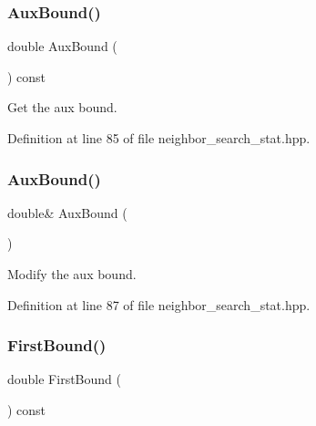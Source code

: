 \subsubsection{Aux\+Bound()\hspace{0.1cm}{\footnotesize\ttfamily [1/2]}}
{\footnotesize\ttfamily double Aux\+Bound (\begin{DoxyParamCaption}{ }\end{DoxyParamCaption}) const\hspace{0.3cm}{\ttfamily [inline]}}



Get the aux bound. 



Definition at line 85 of file neighbor\+\_\+search\+\_\+stat.\+hpp.

\mbox{\label{classmlpack_1_1neighbor_1_1NeighborSearchStat_a06f9e5b8efdd5fb48920f5fe3dc79fec}} 
\subsubsection{Aux\+Bound()\hspace{0.1cm}{\footnotesize\ttfamily [2/2]}}
{\footnotesize\ttfamily double\& Aux\+Bound (\begin{DoxyParamCaption}{ }\end{DoxyParamCaption})\hspace{0.3cm}{\ttfamily [inline]}}



Modify the aux bound. 



Definition at line 87 of file neighbor\+\_\+search\+\_\+stat.\+hpp.

\mbox{\label{classmlpack_1_1neighbor_1_1NeighborSearchStat_a1e5556b0247e4b4ecb9a4c6870879f9d}} 
\subsubsection{First\+Bound()\hspace{0.1cm}{\footnotesize\ttfamily [1/2]}}
{\footnotesize\ttfamily double First\+Bound (\begin{DoxyParamCaption}{ }\end{DoxyParamCaption}) const\hspace{0.3cm}{\ttfamily [inline]}}



